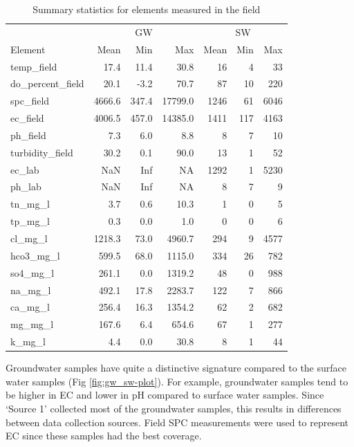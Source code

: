 \documentclass[, manuscript]{copernicus}
\begin{document}
\begin{table}
\centering
\caption{\label{tab:TableElementstats}Summary statistics for elements measured in the field}
\centering
\begin{tabular}[t]{l|r|r|r|r|r|r}
\hline
\multicolumn{1}{c|}{} & \multicolumn{3}{c|}{GW} & \multicolumn{3}{c}{SW} \\
\cline{2-4} \cline{5-7}
Element & Mean & Min & Max & Mean & Min & Max\\
\hline
temp\_field & 17.4 & 11.4 & 30.8 & 16 & 4 & 33\\
\hline
do\_percent\_field & 20.1 & -3.2 & 70.7 & 87 & 10 & 220\\
\hline
spc\_field & 4666.6 & 347.4 & 17799.0 & 1246 & 61 & 6046\\
\hline
ec\_field & 4006.5 & 457.0 & 14385.0 & 1411 & 117 & 4163\\
\hline
ph\_field & 7.3 & 6.0 & 8.8 & 8 & 7 & 10\\
\hline
turbidity\_field & 30.2 & 0.1 & 90.0 & 13 & 1 & 52\\
\hline
ec\_lab & NaN & Inf & NA & 1292 & 1 & 5230\\
\hline
ph\_lab & NaN & Inf & NA & 8 & 7 & 9\\
\hline
tn\_mg\_l & 3.7 & 0.6 & 10.3 & 1 & 0 & 5\\
\hline
tp\_mg\_l & 0.3 & 0.0 & 1.0 & 0 & 0 & 6\\
\hline
cl\_mg\_l & 1218.3 & 73.0 & 4960.7 & 294 & 9 & 4577\\
\hline
hco3\_mg\_l & 599.5 & 68.0 & 1115.0 & 334 & 26 & 782\\
\hline
so4\_mg\_l & 261.1 & 0.0 & 1319.2 & 48 & 0 & 988\\
\hline
na\_mg\_l & 492.1 & 17.8 & 2283.7 & 122 & 7 & 866\\
\hline
ca\_mg\_l & 256.4 & 16.3 & 1354.2 & 62 & 2 & 682\\
\hline
mg\_mg\_l & 167.6 & 6.4 & 654.6 & 67 & 1 & 277\\
\hline
k\_mg\_l & 4.4 & 0.0 & 30.8 & 8 & 1 & 44\\
\hline
\end{tabular}
\end{table}

Groundwater samples have quite a distinctive signature compared to the
surface water samples (Fig \ref{fig:gw_sw-plot}). For example,
groundwater samples tend to be higher in EC and lower in pH compared to
surface water samples. Since `Source 1' collected most of the
groundwater samples, this results in differences between data collection
sources. Field SPC measurements were used to represent EC since these
samples had the best coverage.
\end{document}
